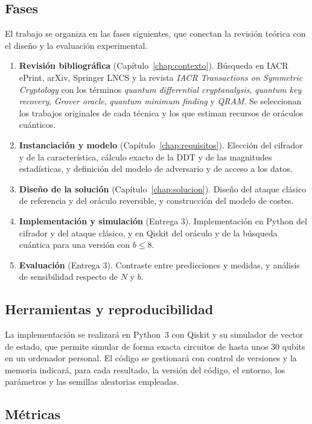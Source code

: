 \subsection{Fases}

El trabajo se organiza en las fases siguientes, que conectan la revisión teórica con el diseño y la evaluación experimental.

\begin{enumerate}
 \item \textbf{Revisión bibliográfica} (Capítulo~\ref{chap:contexto}). Búsqueda en IACR ePrint, arXiv, Springer LNCS y la revista \emph{IACR Transactions on Symmetric Cryptology} con los términos \emph{quantum differential cryptanalysis}, \emph{quantum key recovery}, \emph{Grover oracle}, \emph{quantum minimum finding} y \emph{QRAM}. Se seleccionan los trabajos originales de cada técnica y los que estiman recursos de oráculos cuánticos.
 \item \textbf{Instanciación y modelo} (Capítulo~\ref{chap:requisitos}). Elección del cifrador y de la característica, cálculo exacto de la DDT y de las magnitudes estadísticas, y definición del modelo de adversario y de acceso a los datos.
 \item \textbf{Diseño de la solución} (Capítulo~\ref{chap:solucion}). Diseño del ataque clásico de referencia y del oráculo reversible, y construcción del modelo de costes.
 \item \textbf{Implementación y simulación} (Entrega 3). Implementación en Python del cifrador y del ataque clásico, y en Qiskit del oráculo y de la búsqueda cuántica para una versión con \(b\le 8\).
 \item \textbf{Evaluación} (Entrega 3). Contraste entre predicciones y medidas, y análisis de sensibilidad respecto de \(N\) y \(b\).
\end{enumerate}

\subsection{Herramientas y reproducibilidad}

La implementación se realizará en Python~3 con Qiskit y su simulador de vector de estado, que permite simular de forma exacta circuitos de hasta unos 30 qubits en un ordenador personal. El código se gestionará con control de versiones y la memoria indicará, para cada resultado, la versión del código, el entorno, los parámetros y las semillas aleatorias empleadas.

\subsection{Métricas}

